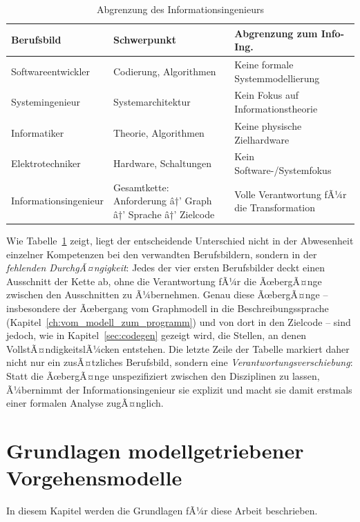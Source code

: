 ﻿\documentclass[a4paper,12pt]{report}
\theoremstyle{definition}
\begin{document}
\begin{table}[h]
\centering
\caption{Abgrenzung des Informationsingenieurs}
\label{tab:abgrenzung}
\begin{tabular}{@{}lp{4.5cm}p{4.5cm}@{}}
\toprule
\textbf{Berufsbild} & \textbf{Schwerpunkt} & \textbf{Abgrenzung zum Info-Ing.} \\
\midrule
Softwareentwickler & Codierung, Algorithmen & Keine formale Systemmodellierung \\
Systemingenieur    & Systemarchitektur      & Kein Fokus auf Informationstheorie \\
Informatiker       & Theorie, Algorithmen   & Keine physische Zielhardware \\
Elektrotechniker   & Hardware, Schaltungen  & Kein Software-/Systemfokus \\
Informationsingenieur & Gesamtkette: Anforderung â†’ Graph â†’ Sprache â†’ Zielcode & Volle Verantwortung fÃ¼r die Transformation \\
\bottomrule
\end{tabular}
\end{table}

\noindent
Wie Tabelle~\ref{tab:abgrenzung} zeigt, liegt der entscheidende Unterschied
nicht in der Abwesenheit einzelner Kompetenzen bei den verwandten
Berufsbildern, sondern in der \emph{fehlenden DurchgÃ¤ngigkeit}: Jedes der
vier ersten Berufsbilder deckt einen Ausschnitt der Kette ab, ohne die
Verantwortung fÃ¼r die ÃœbergÃ¤nge zwischen den Ausschnitten zu Ã¼bernehmen.
Genau diese ÃœbergÃ¤nge -- insbesondere der Ãœbergang vom Graphmodell in die
Beschreibungssprache (Kapitel~\ref{ch:vom_modell_zum_programm}) und von dort
in den Zielcode -- sind jedoch, wie in Kapitel~\ref{sec:codegen} gezeigt
wird, die Stellen, an denen VollstÃ¤ndigkeitslÃ¼cken entstehen. Die letzte
Zeile der Tabelle markiert daher nicht nur ein zusÃ¤tzliches Berufsbild,
sondern eine \emph{Verantwortungsverschiebung}: Statt die ÃœbergÃ¤nge
unspezifiziert zwischen den Disziplinen zu lassen, Ã¼bernimmt der
Informationsingenieur sie explizit und macht sie damit erstmals einer
formalen Analyse zugÃ¤nglich.


\chapter{Grundlagen modellgetriebener Vorgehensmodelle}

In diesem Kapitel werden die Grundlagen fÃ¼r diese Arbeit beschrieben.
\end{document}
